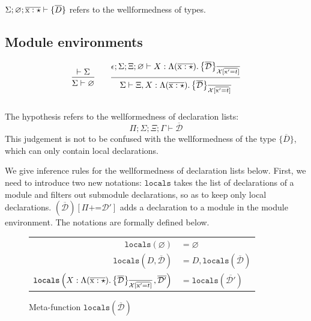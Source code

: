\documentclass[12pt]{article}
\newcommand{\tx}{\text{\rm x}}
\newcommand{\emptyenv}{\varnothing}
\newcommand{\Gammatop}{\ensuremath{\Xi}}
\newcommand{\Gammabot}{\ensuremath{\Gamma}}
\newcommand{\locals}{\texttt{locals}}
\begin{document}
$ \Sigma; \emptyenv; \overline{\tx : \star} \vdash \{ \overline{D} \}$ refers to the wellformedness of types.

\subsection{Module environments}

\[
    \begin{prooftree}
        \hypo { \vdash \Sigma }
        \infer1 { \Sigma \vdash \emptyenv }
    \end{prooftree}
    \qquad
    \begin{prooftree}
        \hypo { \epsilon; \Sigma; \Gammatop; \emptyenv \vdash X : \Moddecl }
        \infer1{ \Sigma \vdash \Gammatop, X : \Moddecl }
    \end{prooftree}
\] \\

The hypothesis refers to the wellformedness of declaration lists: $$\Pi; \Sigma; \Gammatop; \Gammabot \vdash \overline{\mathcal{D}}$$
This judgement is not to be confused with the wellformedness of the type $\{\overline{D}\}$, which can only contain local declarations.

We give inference rules for the wellformedness of declaration lists below.
First, we need to introduce two new notations:
$\locals$ takes the list of declarations of a module and filters out submodule
declarations, so as to keep only local declarations. $(\overline{\mathcal{D}})[\Pi \texttt{+=} \mathcal{D}']$ adds a declaration
to a module in the module environment. The notations are formally defined below.

\begin{figure}[H]
    \begin{center}
        \begin{tabular}{rl}
            $\locals(\emptyenv)$                                        & $= \emptyenv$                          \\
            $\locals(D, \overline{\mathcal{D}})$                        & $= D, \locals(\overline{\mathcal{D}})$ \\
            $\locals\left(X : \Moddecl, \overline{\mathcal{D'}}\right)$ & $= \locals(\overline{\mathcal{D'}})$
        \end{tabular}
    \end{center}
    \caption{Meta-function $\locals(\overline{\mathcal{D}})$}
\end{figure}
\end{document}

